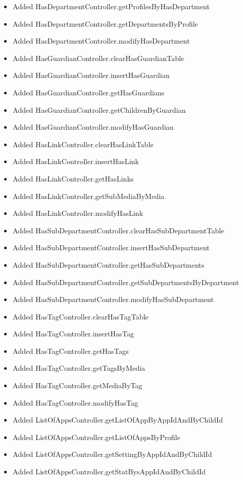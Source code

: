 \begin{itemize}
\begin{itemize}
		\item Added HasDepartmentController.getProfilesByHasDepartment
		\item Added HasDepartmentController.getDepartmentsByProfile
		\item Added HasDepartmentController.modifyHasDepartment
		\item Added HasGuardianController.clearHasGuardianTable
		\item Added HasGuardianController.insertHasGuardian
		\item Added HasGuardianController.getHasGuardians
		\item Added HasGuardianController.getChildrenByGuardian
		\item Added HasGuardianController.modifyHasGuardian
		\item Added HasLinkController.clearHasLinkTable
		\item Added HasLinkController.insertHasLink
		\item Added HasLinkController.getHasLinks
		\item Added HasLinkController.getSubMediaByMedia
		\item Added HasLinkController.modifyHasLink
		\item Added HasSubDepartmentController.clearHasSubDepartmentTable
		\item Added HasSubDepartmentController.insertHasSubDepartment
		\item Added HasSubDepartmentController.getHasSubDepartments
		\item Added HasSubDepartmentController.getSubDepartmentsByDepartment
		\item Added HasSubDepartmentController.modifyHasSubDepartment
		\item Added HasTagController.clearHasTagTable
		\item Added HasTagController.insertHasTag
		\item Added HasTagController.getHasTags
		\item Added HasTagController.getTagsByMedia
		\item Added HasTagController.getMediaByTag
		\item Added HasTagController.modifyHasTag
		\item Added ListOfAppsController.getListOfAppByAppIdAndByChildId
		\item Added ListOfAppsController.getListOfAppsByProfile
		\item Added ListOfAppsController.getSettingByAppIdAndByChildId
		\item Added ListOfAppsController.getStatBysAppIdAndByChildId

\end{itemize}
\end{itemize}
